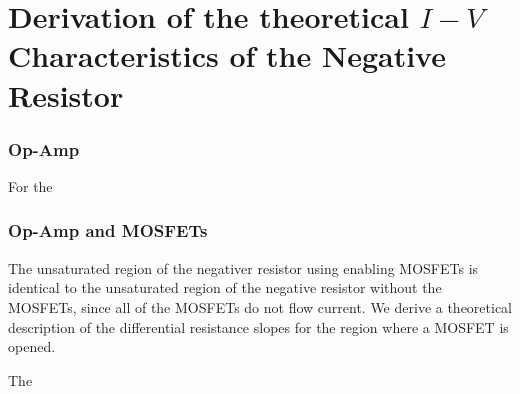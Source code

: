 \documentclass[%
 aip,
amsmath,amssymb,
reprint,
]{revtex4-1}
\begin{document}
\section{Derivation of the theoretical $I-V$ Characteristics of the Negative Resistor}
\subsubsection{\label{opampiv}Op-Amp}
For the 

\subsubsection{\label{opamp_mosfetiv}Op-Amp and MOSFETs}
The unsaturated region of the negativer resistor using enabling MOSFETs is identical to the unsaturated region of the negative resistor without the MOSFETs, since all of the MOSFETs do not flow current. We derive a theoretical description of the differential resistance slopes for the region where a MOSFET is opened. 

The 
\end{document}
